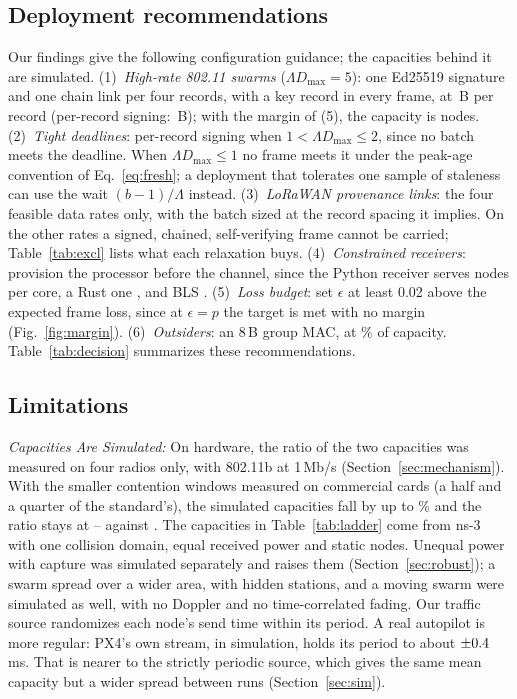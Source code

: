 \documentclass[lineno,pdflatex,sn-mathphys-num]{sn-jnl}
\newcommand{\runin}[1]{\textit{#1:}}
\renewcommand{\_}{\authbcunderscore\allowbreak}
\begin{document}
\subsection{Deployment recommendations}\label{sec:recommend}
Our findings give the following configuration guidance; the capacities behind it are simulated.
(1)~\emph{High-rate 802.11 swarms} ($\Lambda D_{\max} = 5$): one Ed25519 signature and one chain
link per four records, with a key record in every frame, at \bprLeanDesign\,B per record
(per-record signing: \bprLeanBase\,B); with the margin of (5), the capacity
is \nmaxTightD{} nodes. (2)~\emph{Tight deadlines}: per-record signing when
$1 < \Lambda D_{\max} \leq 2$, since no batch meets the deadline. When $\Lambda D_{\max} \leq 1$ no
frame meets it under the peak-age convention of Eq.~\eqref{eq:fresh}; a deployment that tolerates
one sample of staleness can use the wait $(b-1)/\Lambda$ instead. (3)~\emph{LoRaWAN provenance
links}: the four feasible data rates only, with the batch sized at the record spacing it implies.
On the other \exclCount{} rates a signed, chained, self-verifying frame cannot be carried;
Table~\ref{tab:excl} lists what each relaxation buys. (4)~\emph{Constrained receivers}: provision
the processor before the channel, since the Python receiver serves \ncpuProto{} nodes per core, a
Rust one \rxRustNodes, and BLS \ncpuBls. (5)~\emph{Loss budget}: set $\epsilon$ at least 0.02 above
the expected frame loss, since at $\epsilon = p$ the target is met with no margin
(Fig.~\ref{fig:margin}). (6)~\emph{Outsiders}: an 8\,B group MAC, at \flTagCostPct\% of capacity.
Table~\ref{tab:decision} summarizes these recommendations.

\subsection{Limitations}\label{sec:limits}

\runin{Capacities Are Simulated} On hardware, the ratio of the two capacities was measured on four
radios only, with 802.11b at 1\,Mb/s (Section~\ref{sec:mechanism}). With the smaller contention
windows measured on commercial cards (a half and a quarter of the standard's), the simulated
capacities fall by up to \winFall\% and the ratio stays at \winRatioQuarter--\winRatioHalf{} against
\winRatioStd. The capacities in Table~\ref{tab:ladder} come from ns-3 with one
collision domain, equal received power and static nodes. Unequal power with capture was simulated
separately and raises them (Section~\ref{sec:robust}); a swarm spread over a wider area, with
hidden stations, and a moving swarm were simulated as well, with no Doppler and no
time-correlated fading. Our traffic source randomizes each node's send time within its period. A
real autopilot is more regular: PX4's own stream, in simulation, holds its period to about
$\pm0.4$\,ms. That is nearer to the strictly periodic source, which gives the same mean
capacity but a wider spread between runs (Section~\ref{sec:sim}).
\end{document}
